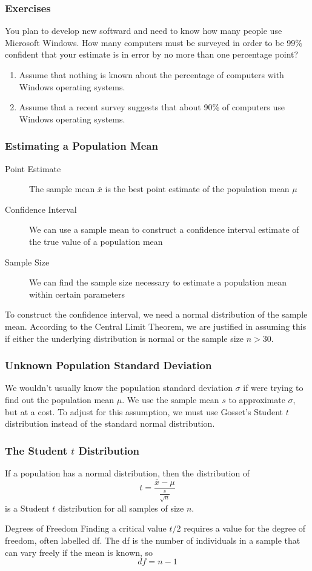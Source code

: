 \documentclass[xcolor=dvipsnames]{beamer}
\begin{document}
\begin{frame}
  \frametitle{Exercises}
{\ubung} You plan to develop new softward and need to know how many
people use Microsoft Windows. How many computers must be surveyed in
order to be 99\% confident that your estimate is in error by no more
than one percentage point?
\begin{enumerate}
\item Assume that nothing is known about the percentage of computers
  with Windows operating systems.
\item Assume that a recent survey suggests that about 90\% of
  computers use Windows operating systems.
\end{enumerate}
\end{frame}

\begin{frame}
  \frametitle{Estimating a Population Mean}
  \begin{description}
  \item[Point Estimate] The sample mean $\bar{x}$ is the best point
    estimate of the population mean $\mu$
  \item[Confidence Interval] We can use a sample mean to construct a
    confidence interval estimate of the true value of a population
    mean
  \item[Sample Size] We can find the sample size necessary to estimate
    a population mean within certain parameters
  \end{description}
To construct the confidence interval, we need a normal distribution of
the sample mean. According to the Central Limit Theorem, we are
justified in  assuming this if either the underlying distribution is
normal or the sample size $n>30$.
\end{frame}

\begin{frame}
  \frametitle{Unknown Population Standard Deviation}
We wouldn't usually know the population standard deviation $\sigma$ if
were trying to find out the population mean $\mu$. We use the sample
mean $s$ to approximate $\sigma$, but at a cost. To adjust for this
assumption, we must use Gosset's \alert{Student $t$ distribution}
instead of the standard normal distribution.
\end{frame}

\begin{frame}
  \frametitle{The Student $t$ Distribution}
If a population has a normal distribution, then the distribution of
\begin{equation}
  \label{eq:aungaecu}
  t=\frac{\bar{x}-\mu}{\frac{s}{\sqrt{n}}}
\end{equation}
is a Student $t$ distribution for all samples of size $n$. 
\begin{block}{Degrees of Freedom}
  Finding a critical value $t/2$ requires a value for the
  \alert{degree of freedom}, often labelled df. The df is the number
  of individuals in a sample that can vary freely if the mean is
  known, so
  \begin{equation}
    \label{eq:aepeidai}
    df=n-1
  \end{equation}
\end{block}
\end{frame}
\end{document}
